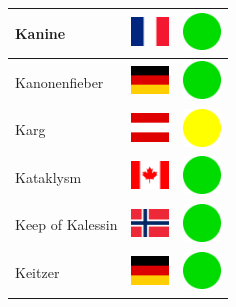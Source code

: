 \documentclass[12pt, a4paper, twoside]{report}
\begin{document}
\begin{center}
\begin{longtable}{|p{5cm}|p{2cm}|p{2cm}|}
 Kanine                                                     & \includegraphics[width=1cm]{../img/flags/fr} &   \includegraphics[width=1cm]{../likes/y} \\ \hline
 Kanonenfieber                                              & \includegraphics[width=1cm]{../img/flags/de} &   \includegraphics[width=1cm]{../likes/y} \\ \hline
 Karg                                                       & \includegraphics[width=1cm]{../img/flags/at} &   \includegraphics[width=1cm]{../likes/m} \\ \hline
 Kataklysm                                                  & \includegraphics[width=1cm]{../img/flags/ca} &   \includegraphics[width=1cm]{../likes/y} \\ \hline
 Keep of Kalessin                                           & \includegraphics[width=1cm]{../img/flags/no} &   \includegraphics[width=1cm]{../likes/y} \\ \hline
 Keitzer                                                    & \includegraphics[width=1cm]{../img/flags/de} &   \includegraphics[width=1cm]{../likes/y} \\ \hline

\end{longtable}
\end{center}
\end{document}
